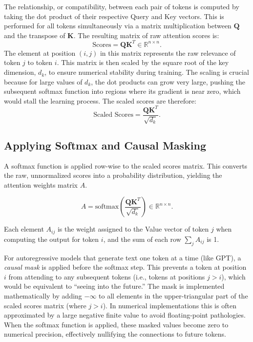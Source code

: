 \documentclass[%
  reprint,
  superscriptaddress,
  showpacs,
  showkeys,
  amsmath,amssymb,
  pra,
  longbibliography,
  floatfix,
  x11names
]{revtex4-2}
\begin{document}
The relationship, or compatibility, between each pair of tokens is computed by taking the dot product of their respective Query and Key vectors. This is performed for all tokens simultaneously via a matrix multiplication between $\bm{Q}$ and the transpose of $\bm{K}$. The resulting matrix of raw attention scores is:
\begin{equation}
    \text{Scores} = \bm{Q} \bm{K}^T \in \mathbb{R}^{n \times n}.
\end{equation}
The element at position $(i,j)$ in this matrix represents the raw relevance of token $j$ to token $i$.
This matrix is then scaled by the square root of the key dimension, $d_k$,
to ensure numerical stability during training.
The scaling is crucial because for large values of $d_k$, the dot products can grow very large,
pushing the subsequent softmax function into regions where its gradient is near zero, which would stall the learning process.
The scaled scores are therefore:
\begin{equation}
    \text{Scaled Scores} = \frac{\bm{Q} \bm{K}^T}{\sqrt{d_k}}.
\end{equation}


\subsection{Applying Softmax and Causal Masking}

A softmax function is applied row-wise to the scaled scores matrix. This converts the raw, unnormalized scores into a probability distribution, yielding the attention weights matrix $A$.

\begin{equation}
    A = \text{softmax}\left(\frac{\bm{Q} \bm{K}^T}{\sqrt{d_k}}\right) \in \mathbb{R}^{n \times n}.
\end{equation}

Each element $A_{ij}$ is the weight assigned to the Value vector of token $j$ when computing the output for token $i$, and the sum of each row $\sum_j A_{ij}$ is 1.

For autoregressive models that generate text one token at a time (like GPT), a \textit{causal mask} is applied before the softmax step. This prevents a token at position $i$ from attending to any subsequent tokens (i.e., tokens at positions $j > i$), which would be equivalent to ``seeing into the future.'' The mask is implemented mathematically by adding $-\infty$ to all elements in the upper-triangular part of the scaled scores matrix (where $j>i$). In numerical implementations this is often approximated by a large negative finite value to avoid floating-point pathologies. When the softmax function is applied, these masked values become zero to numerical precision, effectively nullifying the connections to future tokens.
\end{document}
